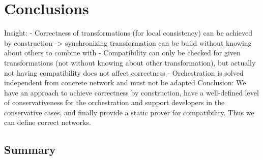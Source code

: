 \chapter{Conclusions}

Insight:
- Correctness of transformations (for local consistency) can be achieved by construction -> synchronizing transformation can be build without knowing about others to combine with
- Compatibility can only be checked for given transformations (not without knowing about other transformation), but actually not having compatibility does not affect correctness
- Orchestration is solved independent from concrete network and must not be adapted
Conclusion: We have an approach to achieve correctness by construction, have a well-defined level of conservativeness for the orchestration and support developers in the conservative cases, and finally provide a static prover for compatibility. Thus we can define correct networks.

\section{Summary}


